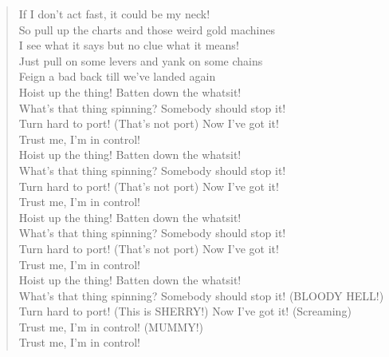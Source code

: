 \documentclass[11pt]{article}
\begin{document}
\begin{verse}
If I don't act fast, it could be my neck!\\
\vspace*{1em}
So pull up the charts and those weird gold machines\\
I see what it says but no clue what it means!\\
Just pull on some levers and yank on some chains\\
Feign a bad back till we've landed again\\
\vspace*{1em}
Hoist up the thing! Batten down the whatsit!\\
What's that thing spinning? Somebody should stop it!\\
Turn hard to port! (That's not port) Now I've got it!\\
Trust me, I'm in control!\\
\vspace*{1em}
Hoist up the thing! Batten down the whatsit!\\
What's that thing spinning? Somebody should stop it!\\
Turn hard to port! (That's not port) Now I've got it!\\
Trust me, I'm in control!\\
\vspace*{1em}
Hoist up the thing! Batten down the whatsit!\\
What's that thing spinning? Somebody should stop it!\\
Turn hard to port! (That's not port) Now I've got it!\\
Trust me, I'm in control!\\
\vspace*{1em}
Hoist up the thing! Batten down the whatsit!\\
What's that thing spinning? Somebody should stop it! (BLOODY HELL!)\\
Turn hard to port! (This is SHERRY!) Now I've got it! (Screaming)\\
Trust me, I'm in control! (MUMMY!)\\
Trust me, I'm in control!\\
\end{verse}
\clearpage
\end{document}

